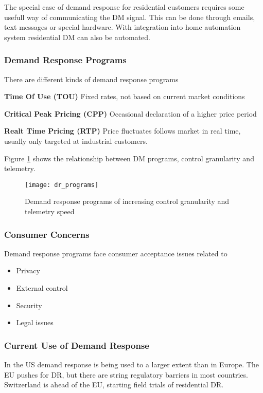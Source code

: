 The special case of demand response for residential customers requires some usefull way of communicating the DM signal.
This can be done through emails, text messages or special hardware.
With integration into home automation system residential DM can also be automated.

\subsubsection{Demand Response Programs}
There are different kinds of demand response programs

\begin{labeling}{}
    \item [\textbf{Time Of Use (TOU)}]
    Fixed rates, not based on current market conditions

    \item [\textbf{Critical Peak Pricing (CPP)}]
    Occasional declaration of a higher price period

    \item [\textbf{Realt Time Pricing (RTP)}]
    Price fluctuates follows market in real time, usually only targeted at industrial customers.

\end{labeling}

Figure \ref{fig:dr_programs} shows the relationship between DM programs, control granularity and telemetry.

\begin{figure}
    \centering
    \texttt{[image: dr\_programs]}
    \caption{Demand response programs of increasing control granularity and telemetry speed}
    \label{fig:dr_programs}
\end{figure}

\subsubsection{Consumer Concerns}
Demand response programs face consumer acceptance issues related to
\begin{itemize}
    \item Privacy
    \item External control
    \item Security
    \item Legal issues
\end{itemize}

\subsubsection{Current Use of Demand Response}
In the US demand response is being used to a larger extent than in Europe.
The EU pushes for DR, but there are string regulatory barriers in most countries.
Switzerland is ahead of the EU, starting field trials of residential DR.
